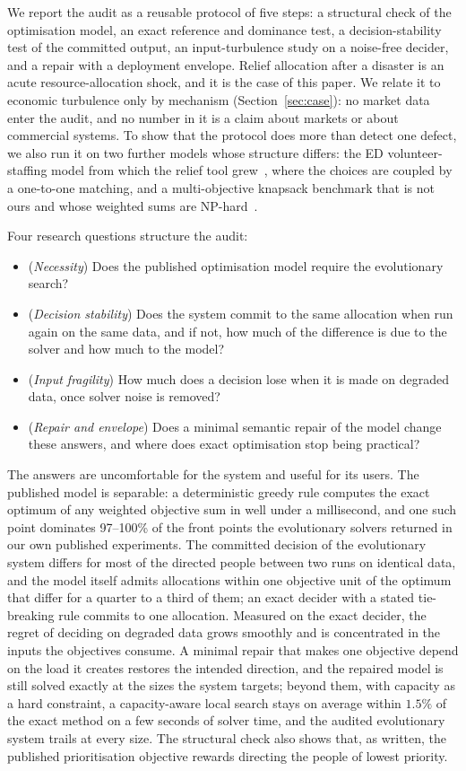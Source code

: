 \documentclass[systems,article,submit,moreauthors,pdftex]{Definitions/mdpi}
\begin{document}
We report the audit as a reusable protocol of five steps: a structural check of the
optimisation model, an exact reference and dominance test, a decision-stability test of the
committed output, an input-turbulence study on a noise-free decider, and a repair with a
deployment envelope. Relief allocation after a disaster is an acute resource-allocation shock,
and it is the case of this paper. We relate it to economic turbulence only by mechanism
(Section~\ref{sec:case}): no market data enter the audit, and no number in it is a claim about
markets or about commercial systems. To show that the protocol does more than detect one
defect, we also run it on two further models whose structure differs: the ED volunteer-staffing
model from which the relief tool grew~\cite{rabiei2023volunteer}, where the choices are coupled
by a one-to-one matching, and a multi-objective knapsack benchmark that is not ours and whose
weighted sums are NP-hard~\cite{zitzler1999spea}.

Four research questions structure the audit:
\begin{itemize}
\item[RQ1] (\emph{Necessity}) Does the published optimisation model require the evolutionary
search?
\item[RQ2] (\emph{Decision stability}) Does the system commit to the same allocation when run
again on the same data, and if not, how much of the difference is due to the solver and how
much to the model?
\item[RQ3] (\emph{Input fragility}) How much does a decision lose when it is made on degraded
data, once solver noise is removed?
\item[RQ4] (\emph{Repair and envelope}) Does a minimal semantic repair of the model change
these answers, and where does exact optimisation stop being practical?
\end{itemize}

The answers are uncomfortable for the system and useful for its users. The published model
is separable: a deterministic greedy rule computes the exact optimum of any weighted
objective sum in well under a millisecond, and one such point dominates 97--100\% of the front points the
evolutionary solvers returned in our own published experiments. The committed decision of the
evolutionary system differs for most of the directed people between two runs on identical
data, and the model itself admits allocations within one objective unit of the optimum that
differ for a quarter to a third of them; an exact decider with a stated tie-breaking rule
commits to one allocation. Measured on the exact decider, the regret of deciding on degraded
data grows smoothly and is concentrated in the inputs the objectives consume. A minimal repair
that makes one objective depend on the load it creates restores the intended direction, and
the repaired model is still solved exactly at the sizes the system targets; beyond them, with
capacity as a hard constraint, a capacity-aware local search stays on average within $1.5\%$ of
the exact method on a few seconds of solver time, and the audited evolutionary system trails at every size. The structural check also shows that, as written, the published
prioritisation objective rewards directing the people of lowest priority.
\end{document}
